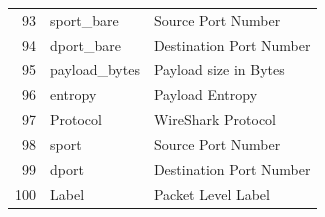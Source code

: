 \documentclass[journal]{IEEEtran}
\begin{document}
\begin{table}[htbp]
{\begin{tabular}{rll}
			\rowcolor[rgb]{ .851,  .851,  .851} 93    & sport\_bare & Source Port Number \\
			94    & dport\_bare & Destination Port Number \\
			\rowcolor[rgb]{ .851,  .851,  .851} 95    & payload\_bytes & Payload size in Bytes \\
			96    & entropy & Payload Entropy \\
			\rowcolor[rgb]{ .851,  .851,  .851} 97    & Protocol & WireShark Protocol \\
			98    & sport & Source Port Number \\
			\rowcolor[rgb]{ .851,  .851,  .851} 99    & dport & Destination Port Number \\
			100   & Label & Packet Level Label \\
			\bottomrule
	\end{tabular}}%
	\label{tab:features2}%
\end{table}%





\end{document}
